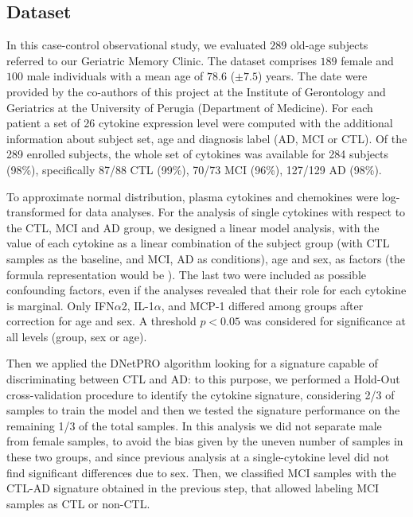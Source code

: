 \documentclass{standalone}
\begin{document}
\subsection[Dataset]{Dataset}\label{cytokine:cytokine_data}

In this case-control observational study, we evaluated $289$ old-age subjects referred to our Geriatric Memory Clinic.
The dataset comprises $189$ female and $100$ male individuals with a mean age of $78.6$ ($\pm7.5$) years.
The date were provided by the co-authors of this project at the Institute of Gerontology and Geriatrics at the University of Perugia (Department of Medicine).
For each patient a set of 26 cytokine expression level were computed with the additional information about subject set, age and diagnosis label (AD, MCI or CTL).
Of the 289 enrolled subjects, the whole set of cytokines was available for 284 subjects (98\%), specifically 87/88 CTL (99\%), 70/73 MCI (96\%), 127/129 AD (98\%).

To approximate normal distribution, plasma cytokines and chemokines were log-transformed for data analyses.
For the analysis of single cytokines with respect to the CTL, MCI and AD group, we designed a linear model analysis, with the value of each cytokine as a linear combination of the subject group (with CTL samples as the baseline, and MCI, AD as conditions), age and sex, as factors (the formula representation would be ).
The last two were included as possible confounding factors, even if the analyses revealed that their role for each cytokine is marginal.
Only IFN$\alpha$2, IL-1$\alpha$, and MCP-1 differed among groups after correction for age and sex.
A threshold $p<0.05$ was considered for significance at all levels (group, sex or age).

Then we applied the DNetPRO algorithm looking for a signature capable of discriminating between CTL and AD: to this purpose, we performed a Hold-Out cross-validation procedure to identify the cytokine signature, considering 2/3 of samples to train the model and then we tested the signature performance on the remaining 1/3 of the total samples.
In this analysis we did not separate male from female samples, to avoid the bias given by the uneven number of samples in these two groups, and since previous analysis at a single-cytokine level did not find significant differences due to sex.
Then, we classified MCI samples with the CTL-AD signature obtained in the previous step, that allowed labeling MCI samples as CTL or non-CTL.

\end{document}
